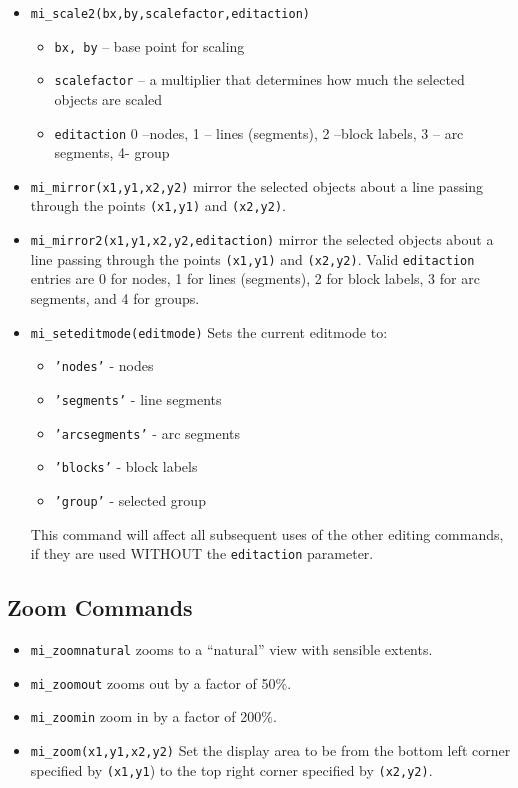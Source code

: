 \begin{itemize}
\item{\tt mi\_scale2(bx,by,scalefactor,editaction)}
        \begin{itemize}
        \item{\tt bx, by} -- base point for scaling
        \item{\tt scalefactor} -- a multiplier that determines how
        much the selected objects are scaled
        \item{\tt editaction}  0 --nodes, 1 -- lines (segments), 2 --block labels, 3 -- arc
                segments, 4- group
        \end{itemize}

\item{\tt mi\_mirror(x1,y1,x2,y2)}
mirror the selected objects about a line passing through the points
{\tt (x1,y1)} and {\tt (x2,y2)}.

\item{\tt mi\_mirror2(x1,y1,x2,y2,editaction)}
mirror the selected objects about a line passing through the points
{\tt (x1,y1)} and {\tt (x2,y2)}. Valid {\tt editaction} entries are
0 for nodes, 1 for lines (segments), 2 for block labels, 3 for arc
segments, and 4 for groups.


\item{\tt mi\_seteditmode(editmode)}
Sets the current editmode to:
        \begin{itemize}
        \item{\tt 'nodes'} - nodes
        \item{\tt 'segments'} - line segments
        \item{\tt 'arcsegments'} - arc segments
        \item{\tt 'blocks'} - block labels
        \item{\tt 'group'} - selected group
        \end{itemize}
This command will affect all subsequent uses of the other editing
commands, if they are used WITHOUT the {\tt editaction} parameter.
\end{itemize}

\subsection{Zoom Commands}

\begin{itemize}
\item{\tt mi\_zoomnatural} zooms to a ``natural'' view with sensible extents.
\item{\tt mi\_zoomout} zooms out by a factor of 50\%.
\item{\tt mi\_zoomin} zoom in by a factor of 200\%.
\item{\tt mi\_zoom(x1,y1,x2,y2)}
Set the display area to be from the bottom left corner specified by
{\tt (x1,y1}) to the top right corner specified by {\tt (x2,y2)}.
\end{itemize}


